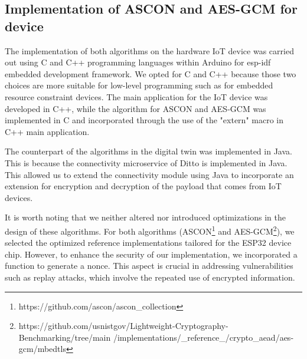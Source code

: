 

\subsection{Implementation of ASCON and AES-GCM for device}


The implementation of both algorithms on the hardware IoT device was carried out using C and C++ programming languages within Arduino for esp-idf embedded development framework. We opted for C and C++ because those two choices are more suitable for low-level programming such as for embedded resource constraint devices. The main application for the IoT device was developed in C++, while the algorithm for ASCON and AES-GCM was implemented in C and incorporated through the use of the "extern" macro in C++ main application.


The counterpart of the algorithms in the digital twin was implemented in Java. This is because the connectivity microservice of Ditto is implemented in Java. This allowed us to extend the connectivity module using Java to incorporate an extension for encryption and decryption of the payload that comes from IoT devices.

It is worth noting that we neither altered nor introduced optimizations in the design of these algorithms. For both algorithms (ASCON\footnote{https://github.com/ascon/ascon\_collection} and AES-GCM\footnote{https://github.com/usnistgov/Lightweight-Cryptography-Benchmarking/tree/main /implementations/\_reference\_/crypto\_aead/aes-gcm/mbedtls}), we selected the optimized reference implementations tailored for the ESP32 device chip. However, to enhance the security of our implementation, we incorporated a function to generate a nonce. This aspect is crucial in addressing vulnerabilities such as replay attacks, which involve the repeated use of encrypted information.
